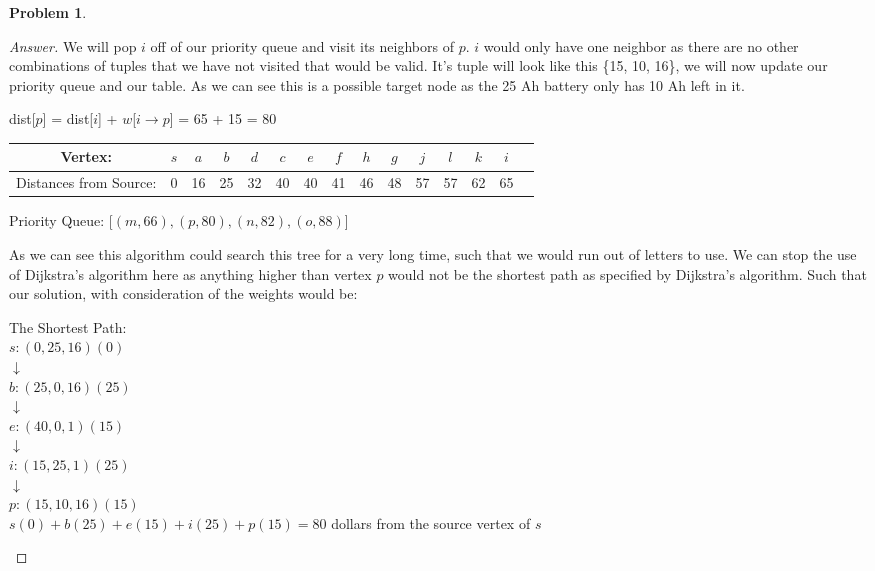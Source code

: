 \documentclass[11pt]{article}
\theoremstyle{definition}
\theoremstyle{definition}
\newtheorem{required}{Problem}
\theoremstyle{definition}
\begin{document}
\begin{required}
\begin{enumerate}[label=(\alph*)]
\begin{proof}[Answer]
We will pop $i$ off of our priority queue and visit its neighbors of $p$. $i$ would only have one neighbor as there are no other combinations of tuples that we have not visited that would be valid. It's tuple will look like this \{15, 10, 16\}, we will now update our priority queue and our table. As we can see this is a possible target node as the 25 Ah battery only has 10 Ah left in it.
\begin{center}
dist[$p$] = dist[$i$]  + $w$[$i \rightarrow p$] = 65 + 15 = 80 \\
\begin{tabular}{ | c | c | c | c | c | c | c | c | c | c | c | c | c | c | c |}
 \hline
 Vertex:& $s$ & $a$ & $b$ & $d$ & $c$ & $e$ & $f$ & $h$ & $g$ & $j$ & $l$ & $k$ & $i$\\ 
 \hline
 Distances from Source:& 0 & 16 & 25 & 32 & 40 & 40 & 41 & 46 & 48 & 57 & 57 & 62 & 65 \\  
 \hline
\end{tabular}
\end{center}
\begin{center}
Priority Queue: [$(m, 66), (p, 80), (n, 82), (o, 88)$]
\end{center}

As we can see this algorithm could search this tree for a very long time, such that we would run out of letters to use. We can stop the use of Dijkstra's algorithm here as anything higher than vertex $p$ would not be the shortest path as specified by Dijkstra's algorithm. Such that our solution, with consideration of the weights would be: \\
\begin{center}
The Shortest Path:\\
$s:(0, 25, 16)(0)$ \\
$\downarrow$\\
$b:(25, 0, 16)(25)$ \\
$\downarrow$\\
$e:(40, 0, 1)(15)$ \\
$\downarrow$\\
$i:(15, 25, 1)(25)$ \\
$\downarrow$\\
$p:(15, 10, 16)(15)$ \\

$s(0) + b(25) + e(15) + i(25) + p(15) = 80$ dollars from the source vertex of $s$

\end{center}

	\end{proof}
\end{enumerate}
\end{required}
\end{document}
